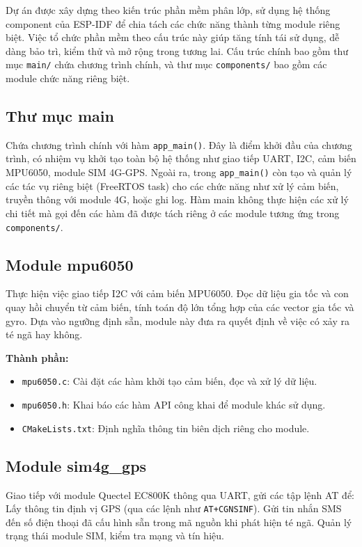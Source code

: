 \documentclass[a4paper,12pt]{report}
\begin{document}
	Dự án được xây dựng theo kiến trúc phần mềm phân lớp, sử dụng hệ thống component của ESP-IDF để chia tách các chức năng thành từng module riêng biệt. Việc tổ chức phần mềm theo cấu trúc này giúp tăng tính tái sử dụng, dễ dàng bảo trì, kiểm thử và mở rộng trong tương lai. Cấu trúc chính bao gồm thư mục \texttt{main/} chứa chương trình chính, và thư mục \texttt{components/} bao gồm các module chức năng riêng biệt.
	
	\subsection{Thư mục main}
	
	Chứa chương trình chính với hàm \texttt{app\_main()}. Đây là điểm khởi đầu của chương trình, có nhiệm vụ khởi tạo toàn bộ hệ thống như giao tiếp UART, I2C, cảm biến MPU6050, module SIM 4G-GPS. Ngoài ra, trong \texttt{app\_main()} còn tạo và quản lý các tác vụ riêng biệt (FreeRTOS task) cho các chức năng như xử lý cảm biến, truyền thông với module 4G, hoặc ghi log. Hàm main không thực hiện các xử lý chi tiết mà gọi đến các hàm đã được tách riêng ở các module tương ứng trong \texttt{components/}.
	
	\subsection{Module mpu6050}
	
	Thực hiện việc giao tiếp I2C với cảm biến MPU6050. Đọc dữ liệu gia tốc và con quay hồi chuyển từ cảm biến, tính toán độ lớn tổng hợp của các vector gia tốc và gyro. Dựa vào ngưỡng định sẵn, module này đưa ra quyết định về việc có xảy ra té ngã hay không.
	
	\textbf{Thành phần:}
	\begin{itemize}
		\item \texttt{mpu6050.c}: Cài đặt các hàm khởi tạo cảm biến, đọc và xử lý dữ liệu.
		\item \texttt{mpu6050.h}: Khai báo các hàm API công khai để module khác sử dụng.
		\item \texttt{CMakeLists.txt}: Định nghĩa thông tin biên dịch riêng cho module.
	\end{itemize}
	
	\subsection{Module sim4g\_gps}
	
	Giao tiếp với module Quectel EC800K thông qua UART, gửi các tập lệnh AT để: Lấy thông tin định vị GPS (qua các lệnh như \texttt{AT+CGNSINF}). Gửi tin nhắn SMS đến số điện thoại đã cấu hình sẵn trong mã nguồn khi phát hiện té ngã. Quản lý trạng thái module SIM, kiểm tra mạng và tín hiệu.
	
\end{document}
